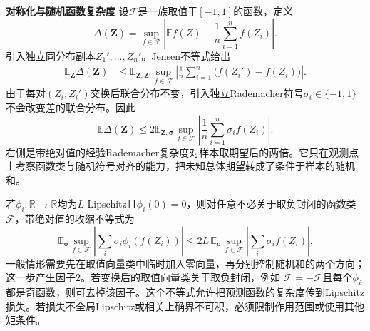\par\medskip\noindent\textbf{对称化与随机函数复杂度}\quad
设\(\mathcal{F}\)是一族取值于\([-1,1]\)的函数，定义
\[ \Delta(\bm{Z})
  =\sup_{f\in\mathcal{F}}\left|\mathbb{E}f(Z)-\frac{1}{n}\sum_{i=1}^{n}f(Z_i)\right|. \]
引入独立同分布副本\(Z_1',\ldots,Z_n'\)。Jensen不等式给出
\[
\begin{aligned}
  \mathbb{E}_{\bm{Z}}\Delta(\bm{Z})
  &\leq
  \mathbb{E}_{\bm{Z},\bm{Z}'}
  \sup_{f\in\mathcal{F}}
  \left|
    \frac{1}{n}\sum_{i=1}^{n}
    \bigl(f(Z_i')-f(Z_i)\bigr)
  \right|.
\end{aligned}
\]
由于每对\((Z_i,Z_i')\)交换后联合分布不变，引入独立Rademacher符号\(\sigma_i\in\{-1,1\}\)不会改变差的联合分布。因此
\[
  \mathbb{E}\Delta(\bm{Z})
  \leq
  2\mathbb{E}_{\bm{Z},\bm{\sigma}}
  \sup_{f\in\mathcal{F}}
  \left|
    \frac{1}{n}\sum_{i=1}^{n}\sigma_i f(Z_i)
  \right|.
\]
右侧是带绝对值的经验Rademacher复杂度对样本取期望后的两倍。它只在观测点上考察函数类与随机符号对齐的能力，把未知总体期望转成了条件于样本的随机和。

若\(\phi_i:\mathbb{R}\to\mathbb{R}\)均为\(L\)-Lipschitz且\(\phi_i(0)=0\)，则对任意不必关于取负封闭的函数类\(\mathcal{F}\)，带绝对值的收缩不等式为
\[
  \mathbb{E}_{\bm{\sigma}}
  \sup_{f\in\mathcal{F}}
  \left|
    \sum_i\sigma_i\phi_i(f(Z_i))
  \right|
  \leq
  2L\,
  \mathbb{E}_{\bm{\sigma}}
  \sup_{f\in\mathcal{F}}
  \left|
    \sum_i\sigma_i f(Z_i)
  \right|.
\]
一般情形需要先在取值向量类中临时加入零向量，再分别控制随机和的两个方向；这一步产生因子\(2\)。若变换后的取值向量类关于取负封闭，例如
\(\mathcal{F}=-\mathcal{F}\)且每个\(\phi_i\)都是奇函数，则可去掉该因子。这个不等式允许把预测函数的复杂度传到Lipschitz损失。若损失不全局Lipschitz或相关上确界不可积，必须限制作用范围或使用其他矩条件。

